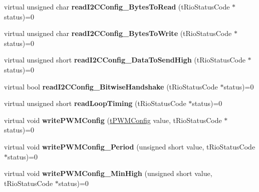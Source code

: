 \begin{DoxyCompactItemize}
\item 
\hypertarget{classnFPGA_1_1nFRC__2012__1__6__4_1_1tDIO_a4730647888ea05fcc38aa03a8891b177}{
virtual unsigned char {\bfseries readI2CConfig\_\-BytesToRead} (tRioStatusCode $\ast$status)=0}
\label{classnFPGA_1_1nFRC__2012__1__6__4_1_1tDIO_a4730647888ea05fcc38aa03a8891b177}

\item 
\hypertarget{classnFPGA_1_1nFRC__2012__1__6__4_1_1tDIO_ad8ca1a0868875d259f9c2f2c85ec38ba}{
virtual unsigned char {\bfseries readI2CConfig\_\-BytesToWrite} (tRioStatusCode $\ast$status)=0}
\label{classnFPGA_1_1nFRC__2012__1__6__4_1_1tDIO_ad8ca1a0868875d259f9c2f2c85ec38ba}

\item 
\hypertarget{classnFPGA_1_1nFRC__2012__1__6__4_1_1tDIO_add9d81cfcc4cd8d243e9fd41517d74dd}{
virtual unsigned short {\bfseries readI2CConfig\_\-DataToSendHigh} (tRioStatusCode $\ast$status)=0}
\label{classnFPGA_1_1nFRC__2012__1__6__4_1_1tDIO_add9d81cfcc4cd8d243e9fd41517d74dd}

\item 
\hypertarget{classnFPGA_1_1nFRC__2012__1__6__4_1_1tDIO_a278476b6a7ba23d7d6cd22c352dda3e5}{
virtual bool {\bfseries readI2CConfig\_\-BitwiseHandshake} (tRioStatusCode $\ast$status)=0}
\label{classnFPGA_1_1nFRC__2012__1__6__4_1_1tDIO_a278476b6a7ba23d7d6cd22c352dda3e5}

\item 
\hypertarget{classnFPGA_1_1nFRC__2012__1__6__4_1_1tDIO_a9af40204587d39a2e4638b016e948638}{
virtual unsigned short {\bfseries readLoopTiming} (tRioStatusCode $\ast$status)=0}
\label{classnFPGA_1_1nFRC__2012__1__6__4_1_1tDIO_a9af40204587d39a2e4638b016e948638}

\item 
\hypertarget{classnFPGA_1_1nFRC__2012__1__6__4_1_1tDIO_a9c4cd22c1c112853df58c4f40262fe5f}{
virtual void {\bfseries writePWMConfig} (\hyperlink{unionnFPGA_1_1nFRC__2012__1__6__4_1_1tDIO_1_1tPWMConfig}{tPWMConfig} value, tRioStatusCode $\ast$status)=0}
\label{classnFPGA_1_1nFRC__2012__1__6__4_1_1tDIO_a9c4cd22c1c112853df58c4f40262fe5f}

\item 
\hypertarget{classnFPGA_1_1nFRC__2012__1__6__4_1_1tDIO_a3f427f96a9017b0f19f91461a3a869a7}{
virtual void {\bfseries writePWMConfig\_\-Period} (unsigned short value, tRioStatusCode $\ast$status)=0}
\label{classnFPGA_1_1nFRC__2012__1__6__4_1_1tDIO_a3f427f96a9017b0f19f91461a3a869a7}

\item 
\hypertarget{classnFPGA_1_1nFRC__2012__1__6__4_1_1tDIO_aa7f3853b9e25915651651d98adc54a59}{
virtual void {\bfseries writePWMConfig\_\-MinHigh} (unsigned short value, tRioStatusCode $\ast$status)=0}
\label{classnFPGA_1_1nFRC__2012__1__6__4_1_1tDIO_aa7f3853b9e25915651651d98adc54a59}


\end{DoxyCompactItemize}
